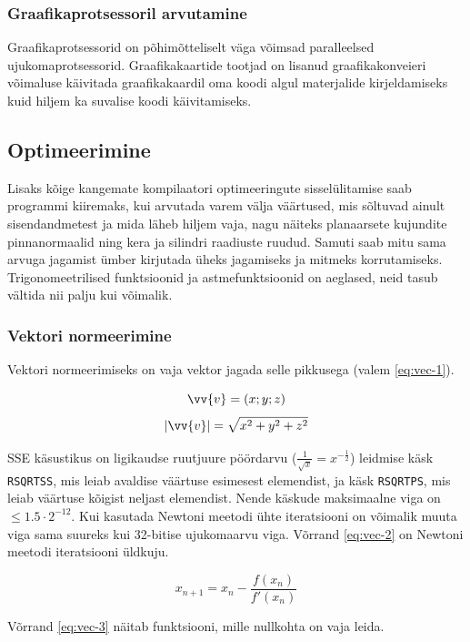 \documentclass[a4paper,12pt]{report}
\renewcommand{\vec}[1]{\vv{#1}}
\begin{document}
\subsubsection{Graafikaprotsessoril arvutamine}
Graafikaprotsessorid on põhimõtteliselt väga võimsad paralleelsed
ujukomaprotsessorid. Graafikakaartide tootjad on lisanud graafikakonveieri
võimaluse käivitada graafikakaardil oma koodi algul materjalide kirjeldamiseks
kuid hiljem ka suvalise koodi käivitamiseks.

\subsection{Optimeerimine}
Lisaks kõige kangemate kompilaatori optimeeringute sisselülitamise saab
programmi kiiremaks, kui arvutada varem välja väärtused, mis sõltuvad
ainult sisendandmetest ja mida läheb hiljem vaja, nagu näiteks planaarsete
kujundite pinnanormaalid ning kera ja silindri raadiuste ruudud. Samuti
saab mitu sama arvuga jagamist ümber kirjutada üheks jagamiseks ja mitmeks
korrutamiseks. Trigonomeetrilised funktsioonid ja astmefunktsioonid on
aeglased, neid tasub vältida nii palju kui võimalik.

\subsubsection{Vektori normeerimine}
Vektori normeerimiseks on vaja vektor jagada selle pikkusega (valem \ref{eq:vec-1}).

\[\vec v = (x; y; z)\]
\begin{equation} \label{eq:vec-1}
|\vec v| = \sqrt{x^2 + y^2 + z^2}
\end{equation}

SSE käsustikus on ligikaudse ruutjuure pöördarvu (\(\frac 1 {\sqrt x} = x^{-\frac12}\)) leidmise käsk
\texttt{RSQRTSS}, mis leiab avaldise väärtuse esimesest elemendist, ja
käsk \texttt{RSQRTPS}, mis leiab väärtuse kõigist neljast elemendist.
Nende käskude maksimaalne viga on \(\leq 1.5 \cdot 2^{-12}\). Kui kasutada Newtoni
meetodi ühte iteratsiooni on võimalik muuta viga sama suureks kui 32-bitise
ujukomaarvu viga. Võrrand \ref{eq:vec-2} on Newtoni meetodi iteratsiooni
üldkuju.

\begin{equation} \label{eq:vec-2}
x_{n+1} = x_n - \frac {f(x_n)}{f'(x_n)}
\end{equation}

Võrrand \ref{eq:vec-3} näitab funktsiooni, mille nullkohta on vaja leida.
\end{document}
